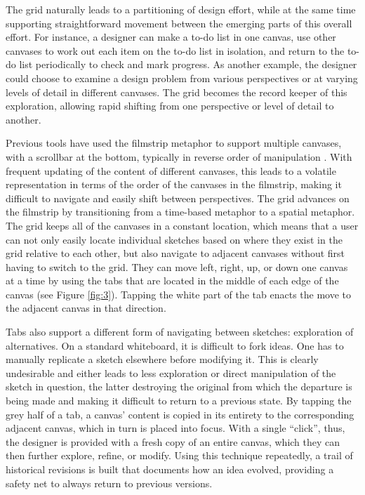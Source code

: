 \documentclass[12pt,fleqn]{ucithesis}
\begin{document}
The grid naturally leads to a partitioning of design effort, while at the same time supporting straightforward movement between the emerging parts of this overall effort. For instance, a designer can make a to-do list in one canvas, use other canvases to work out each item on the to-do list in isolation, and return to the to-do list periodically to check and mark progress. As another example, the designer could choose to examine a design problem from various perspectives or at varying levels of detail in different canvases. The grid becomes the record keeper of this exploration, allowing rapid shifting from one perspective or level of detail to another.

Previous tools have used the filmstrip metaphor to support multiple canvases, with a scrollbar at the bottom, typically in reverse order of manipulation \citep{Stefik}. With frequent updating of the content of different canvases, this leads to a volatile representation in terms of the order of the canvases in the filmstrip, making it difficult to navigate and easily shift between perspectives. The grid advances on the filmstrip by transitioning from a time-based metaphor to a spatial metaphor. The grid keeps all of the canvases in a constant location, which means that a user can not only easily locate individual sketches based on where they exist in the grid relative to each other, but also navigate to adjacent canvases without first having to switch to the grid. They can move left, right, up, or down one canvas at a time by using the tabs that are located in the middle of each edge of the canvas (see Figure \ref{fig:3}). Tapping the white part of the tab enacts the move to the adjacent canvas in that direction.

Tabs also support a different form of navigating between sketches: exploration of alternatives. On a standard whiteboard, it is difficult to fork ideas. One has to manually replicate a sketch elsewhere before modifying it. This is clearly undesirable and either leads to less exploration or direct manipulation of the sketch in question, the latter destroying the original from which the departure is being made and making it difficult to return to a previous state. By tapping the grey half of a tab, a canvas' content is copied in its entirety to the corresponding adjacent canvas, which in turn is placed into focus. With a single ``click'', thus, the designer is provided with a fresh copy of an entire canvas, which they can then further explore, refine, or modify. Using this technique repeatedly, a trail of historical revisions is built that documents how an idea evolved, providing a safety net to always return to previous versions.
\end{document}
